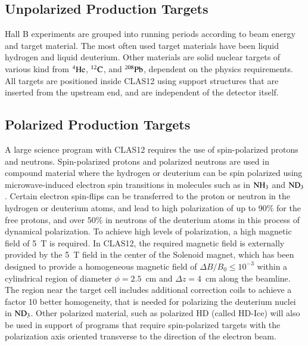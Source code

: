 \documentclass[final,3p,twocolumn]{elsarticle}
\begin{document}
\subsection{Unpolarized Production Targets} 

Hall B experiments are grouped into running periods according to beam energy and target material. The most often
used target materials have been liquid hydrogen and liquid deuterium. Other materials are solid nuclear targets of
various kind from $\rm ^4He$, $\rm ^{12}C$, and $\rm ^{208}Pb$, dependent on the physics requirements. All targets
are positioned inside CLAS12 using support structures that are inserted from the upstream end, and are independent 
of the detector itself. 

 \subsection{Polarized Production Targets} 

A large science program with CLAS12 requires the use of spin-polarized protons and neutrons. 
Spin-polarized protons and polarized neutrons are used in compound material where the hydrogen or 
deuterium can be spin polarized using microwave-induced electron spin transitions in molecules such as 
in $\rm NH_3$ and $\rm ND_3$. Certain electron spin-flips can be transferred to the proton or neutron in the 
hydrogen or deuterium atoms, and lead to high polarization of up to 90\% for the free protons, and 
over 50\% in neutrons of the deuterium atoms in this process of dynamical polarization. To achieve 
high levels of polarization, a high magnetic field of 5~T is required. In CLAS12, the required magnetic 
field is externally 
provided by the 5~T field in the center of the Solenoid magnet, which has been designed to provide 
a homogeneous magnetic field of $\Delta B / B_0 \leq 10^{-3}$ within a cylindrical region of diameter 
$\phi = 2.5$~cm and $\Delta{z} = 4$~cm along the beamline.  The region near the target cell includes 
additional correction coils to achieve a factor 10 better homogeneity, that is needed for polarizing 
the deuterium nuclei in $\rm ND_3$. Other polarized material, such as polarized HD (called HD-Ice)  
will also be used in support of programs that require spin-polarized targets with the polarization axis 
oriented transverse to the direction of the electron beam.        
\end{document}
